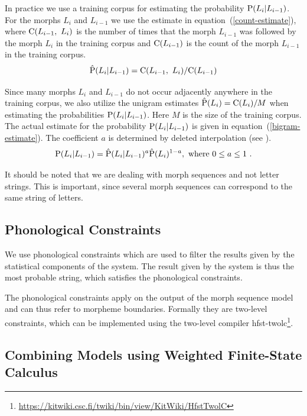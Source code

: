 \documentclass{llncs}
\begin{document}
In practice we use a training corpus for estimating the probability
${\rm P}(L_i | L_{i-1})$. For the morphs $L_i$ and $L_{i-1}$ we
use the estimate in equation~(\ref{count-estimate}), where ${\rm
  C}(L_{i-1},\ L_i)$ is the number of times that the morph $L_{i-1}$
was followed by the morph $L_i$ in the training corpus and ${\rm
  C}(L_{i-1})$ is the count of the morph $L_{i-1}$ in the training
corpus.
\begin{equation}\label{count-estimate}
{\rm \hat{P}}(L_i | L_{i-1}) = {\rm C}(L_{i - 1},\ L_i) / {\rm
  C}(L_{i-1})
\end{equation}

Since many morphs $L_i$ and $L_{i-1}$ do not occur adjacently anywhere
in the training corpus, we also utilize the unigram estimates ${\rm
  \hat{P}}(L_i) = {\rm C}(L_i)/M$ when estimating the probabilities
${\rm P}(L_i | L_{i-1})$. Here $M$ is the size of the training
corpus. The actual estimate for the probability ${\rm P}(L_i |
L_{i-1})$ is given in equation~(\ref{bigram-estimate}). The
coefficient $a$ is determined by deleted interpolation (see
\cite{Brants:2000}).
\begin{equation}\label{bigram-estimate}
{\rm P}(L_i | L_{i-1}) = {\rm \hat{P}}(L_i | L_{i-1})^a{\rm
  \hat{P}}(L_i)^{1 - a}{\rm,\ where }\ 0\leq a \leq 1\ {\rm.}
\end{equation}

It should be noted that we are dealing with morph sequences and not
letter strings. This is important, since several morph sequences can
correspond to the same string of letters.

\subsection{Phonological Constraints}

We use phonological constraints which are used to filter the results
given by the statistical components of the system. The result given by
the system is thus the most probable string, which satisfies the
phonological constraints. 

The phonological constraints apply on the output of the morph sequence
model and can thus refer to morpheme boundaries. Formally they are
two-level constraints, which can be implemented using the two-level
compiler hfst-twolc\footnote{\url{https://kitwiki.csc.fi/twiki/bin/view/KitWiki/HfstTwolC}}.

\subsection{Combining Models using Weighted Finite-State Calculus}
\end{document}
